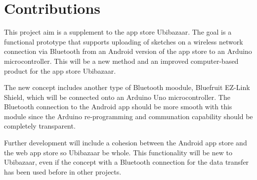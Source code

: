 \section{Contributions}

This project aim is a supplement to the app store Ubibazaar. The goal is a functional prototype that supports uploading of sketches on a wireless network connection via Bluetooth from an Android version of the app store to an Arduino microcontroller. This will be a new method and an improved computer-based product for the app store Ubibazaar.

The new concept includes another type of Bluetooth moodule, Bluefruit EZ-Link Shield, which will be connected onto an Arduino Uno microcontroller. The Bluetooth connection to the Android app should be more smooth with this module since the Arduino re-programming and communation capability should be completely transparent.

Further development will include a cohesion between the Android app store and the web app store so Ubibazaar be whole. This functionality will be new to Ubibazaar, even if the concept with a Bluetooth connection for the data transfer has been used before in other projects.
